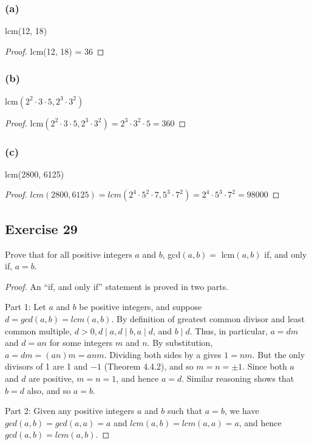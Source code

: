 \documentclass[14pt]{extarticle}
\begin{document}
\subsubsection{(a)}
lcm(12, 18)

\begin{proof}
    lcm(12, 18) = 36
\end{proof}

\subsubsection{(b)}
lcm$(2^2 \cdot 3 \cdot 5, 2^3 \cdot 3^2)$

\begin{proof}
    lcm$(2^2 \cdot 3 \cdot 5, 2^3 \cdot 3^2) = 2^3\cdot 3^2 \cdot 5 = 360$
\end{proof}

\subsubsection{(c)}
lcm(2800, 6125)

\begin{proof}
    $lcm(2800, 6125) = lcm(2^4 \cdot 5^2 \cdot 7, 5^3 \cdot 7^2) = 2^4 \cdot 5^3 \cdot 7^2 = 98000$
\end{proof}

\subsection{Exercise 29}
Prove that for all positive integers $a$ and $b$, gcd$(a, b) =$ lcm$(a, b)$ if, and only if, $a = b$.

\begin{proof}
    An ``if, and only if'' statement is proved in two parts.

    Part 1: Let $a$ and $b$ be positive integers, and suppose $d = gcd(a, b) = lcm(a, b)$. By definition of greatest common divisor and least common multiple, $d > 0, d \mid a, d\mid b, a\mid d$, and $b \mid d$. Thus, in particular, $a = dm$ and $d = an$ for some integers $m$ and $n$. By substitution, $a = dm = (an)m = anm$. Dividing both sides by a gives $1 = nm$. But the only divisors of 1 are 1 and $-1$ (Theorem 4.4.2), and so $m = n = \pm 1$. Since both $a$ and $d$ are positive, $m = n = 1$, and hence $a = d$. Similar reasoning shows that $b = d$ also, and so $a = b$.

    Part 2: Given any positive integers $a$ and $b$ such that $a = b$, we have $gcd(a, b) = gcd(a, a) = a$ and $lcm(a, b) = lcm(a, a) = a$, and hence $gcd(a, b) = lcm(a, b)$.
\end{proof}
\end{document}
